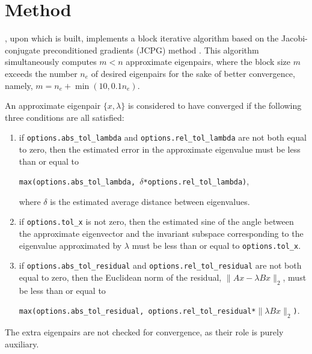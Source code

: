 \section{Method}
\label{sec:method}

{\tt \engine}, upon which {\tt\fullpackagename} is built,
implements a block iterative algorithm
based on the Jacobi-conjugate preconditioned gradients (JCPG) method
\cite{jcpg1,jcpg2}.
This algorithm simultaneously computes $m < n$ approximate eigenpairs,
where the block size $m$ exceeds the number $n_e$ of desired eigenpairs
for the sake of better convergence, namely,
$m = n_e + \min(10, 0.1 n_e)$.

An approximate eigenpair 
$\{x,\lambda\}$ is considered to have converged
if %
the following three conditions are all satisfied:
%
\begin{enumerate}
%
\item
if {\tt options.abs\_tol\_lambda} and 
{\tt options.rel\_tol\_lambda}
are not both equal to zero, then
the estimated error in the approximate eigenvalue
must be less than or equal to

{\tt max(options.abs\_tol\_lambda, 
$\delta$*options.rel\_tol\_lambda)},

where $\delta$ is the estimated average distance
between eigenvalues.
\item
if {\tt options.tol\_x} is not zero, then
the estimated sine of the angle between
the approximate eigenvector and the invariant subspace
corresponding to the eigenvalue 
approximated by $\lambda$
must be less than or equal to {\tt options.tol\_x}.
%
\item
if {\tt options.abs\_tol\_residual} and 
{\tt options.rel\_tol\_residual}
are not both equal to zero, then
the Euclidean norm of the residual,
$\|A x - \lambda B x\|_2$,
must be less than or equal to

{\tt max(options.abs\_tol\_residual, 
options.rel\_tol\_residual*$\|\lambda B x\|_2$)}.
%
\end{enumerate}
%
The extra eigenpairs are not checked for convergence,
as their role is purely auxiliary.

